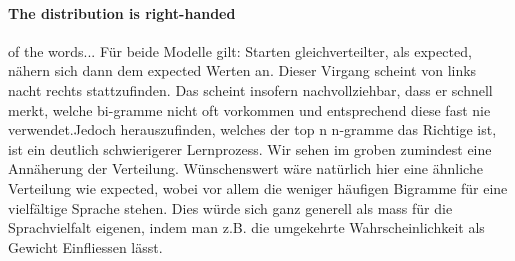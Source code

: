 \paragraph{The distribution is right-handed} of the words... Für beide Modelle gilt: Starten gleichverteilter, als expected, nähern sich dann dem expected Werten an. Dieser Virgang scheint von links nacht rechts stattzufinden. Das scheint insofern nachvollziehbar, dass er schnell merkt, welche bi-gramme nicht oft vorkommen und entsprechend diese fast nie verwendet.Jedoch herauszufinden, welches der top n n-gramme das Richtige ist, ist ein deutlich schwierigerer Lernprozess. Wir sehen im groben zumindest eine Annäherung der Verteilung. Wünschenswert wäre natürlich hier eine ähnliche Verteilung wie expected, wobei vor allem die weniger häufigen Bigramme für eine vielfältige Sprache stehen. Dies würde sich ganz generell als mass für die Sprachvielfalt eigenen, indem man z.B. die umgekehrte Wahrscheinlichkeit als Gewicht Einfliessen lässt.
